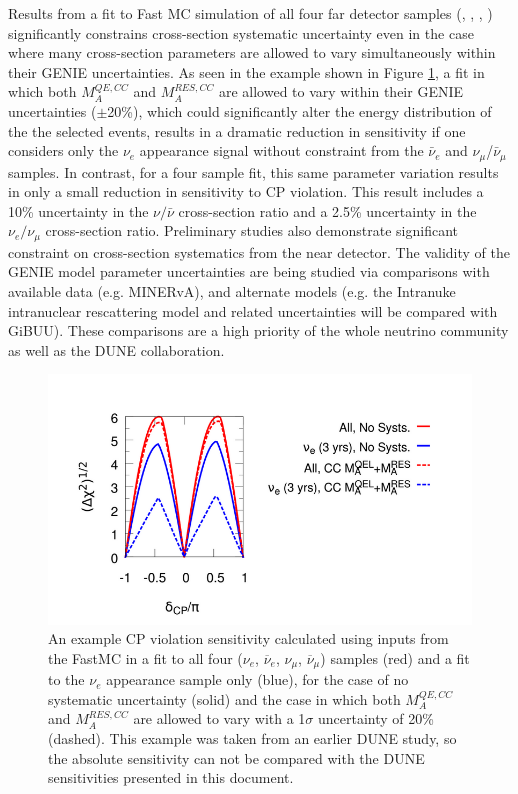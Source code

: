 Results from a fit to Fast MC simulation of all four far detector samples
(\nue, \anue, \numu, \anumu) significantly
constrains cross-section systematic uncertainty even in the case where many
cross-section parameters are allowed to vary simultaneously within their
GENIE uncertainties. As seen in the example shown in Figure
\ref{fig:MAresqesyst}, 
a fit in which both $M_A^{QE,CC}$ and 
$M_A^{RES,CC}$ are allowed to vary within their GENIE uncertainties 
($\pm$20\%), which could significantly alter the energy distribution of the 
the selected events, results in a dramatic reduction in sensitivity if one 
considers only the $\nu_e$ appearance signal without constraint from the 
$\bar{\nu}_e$ and $\nu_{\mu}$/$\bar{\nu}_{\mu}$ samples.
In contrast, for a four sample fit,
this same parameter variation results in only a small reduction in
sensitivity to CP violation.
This result includes a 10\% uncertainty in the $\nu/\bar{\nu}$
cross-section ratio and a 2.5\% uncertainty in the $\nu_e/\nu_{\mu}$
cross-section ratio.
Preliminary studies also
demonstrate significant constraint on cross-section systematics from the 
near detector. The validity of the GENIE model parameter uncertainties are being studied 
via comparisons with available data (e.g. MINERvA), and alternate models (e.g. the 
Intranuke intranuclear rescattering model and related uncertainties will be compared with GiBUU).
These comparisons are a high priority of the whole neutrino community as well as the DUNE collaboration.
\begin{figure}[!htbp]
\centering
\includegraphics[width=0.8\linewidth]{volume-physics/figures/CPV_MARESQE.png}
\caption{An example CP violation sensitivity calculated using inputs from the 
  FastMC in a fit to all four ($\nu_e$, $\overline\nu_e$, $\nu_{\mu}$, 
  $\overline\nu_{\mu}$) samples (red) and a fit to the $\nu_e$ appearance sample 
  only (blue), for the case of no systematic uncertainty (solid) and the case in
  which both $M_A^{QE,CC}$ and $M_A^{RES,CC}$ are allowed to vary with a
  1$\sigma$ uncertainty of 20\% (dashed). This example was taken from an earlier
  DUNE study, so the absolute sensitivity can not be compared with the DUNE 
  sensitivities presented in this document.}
\label{fig:MAresqesyst}
\end{figure}

